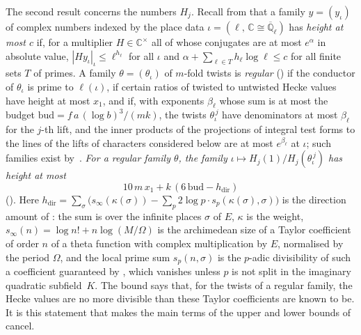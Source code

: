 \documentclass[10pt]{amsart}
\theoremstyle{definition}
\theoremstyle{remark}
\begin{document}
The second result concerns the numbers $H_j$. Recall from {\cite[\S14.2]{P46}} that a family
$y=(y_\iota)$ of complex numbers indexed by the place data $\iota=(\ell,\,\mathbb C\cong
\overline{\mathbb Q}_\ell)$ has \emph{height at most $c$} if, for a multiplier $H\in\mathbb C^\times$
all of whose conjugates are at most $e^\alpha$ in absolute value, $|Hy_\iota|_\iota\le\ell^{h_\ell}$
for all $\iota$ and $\alpha+\sum_{\ell\in T}h_\ell\log\ell\le c$ for all finite sets $T$ of primes.
A family $\theta=(\theta_\iota)$ of $m$-fold twists is \emph{regular}
({\cite[Definition~14.39]{P46}}) if the conductor of $\theta_\iota$ is prime to $\ell(\iota)$,
if certain ratios of twisted to untwisted Hecke values have height at most $x_1$, and if, with
exponents $\beta_\ell$ whose sum is at most the budget $\mathrm{bud}=f\,a\,(\log b)^3/(mk)$, the
twists $\theta_\iota^{\,j}$ have denominators at most $\beta_\ell$ for the $j$-th lift, and
the inner products of the projections of integral test forms to the lines of the lifts of
characters considered below are at most $e^{\beta_\ell}$ at $\iota$; such families exist by~\cite{P55}.
\emph{For a regular family $\theta$, the family $\iota\mapsto H_j(1)/H_j(\theta_\iota^{\,j})$ has
height at most}
\[
10\,m\,x_1+k\,(6\,\mathrm{bud}-h_{\mathrm{dir}})
\]
({\cite[Proposition~14.42]{P46}}). Here $h_{\mathrm{dir}}=\sum_{\sigma}\bigl(s_\infty(\kappa(\sigma))-
\sum_p2\log p\cdot s_p(\kappa(\sigma),\sigma)\bigr)$ is the direction amount of
{\cite[Definition~14.8]{P46}}: the sum is over the infinite places $\sigma$ of $E$, $\kappa$ is
the weight, $s_\infty(n)=\log n!+n\log(M/\Omega)$ is the archimedean size of a Taylor coefficient
of order $n$ of a theta function with complex multiplication by $E$, normalised by the period
$\Omega$, and the local prime sum $s_p(n,\sigma)$ is the $p$-adic divisibility of such a
coefficient guaranteed by {\cite[Proposition~14.10]{P46}}, which vanishes unless $p$ is not split in
the imaginary quadratic subfield~$K$. The bound says that, for the twists of a regular family,
the Hecke values are no more divisible than these Taylor coefficients are known to be. It is this
statement that makes the main terms of the upper and lower bounds of~\cite{P46} cancel.
\end{document}

